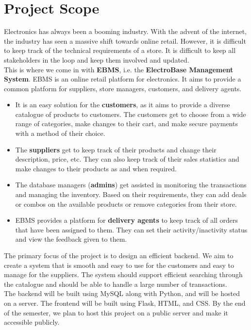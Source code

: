 
\section*{\Huge Project Scope}
\vspace*{10pt}
Electronics has always been a booming industry.
With the advent of the internet, the industry has seen a massive shift towards online retail.
However, it is difficult to keep track of the technical requirements of a store.
It is difficult to keep all stakeholders in the loop and keep them involved and updated.
\vspace*{10pt} \\
This is where we come in with \textbf{EBMS}, i.e. the \textbf{ElectroBase Management System}.
EBMS is an online retail platform for electronics.
It aims to provide a common platform for suppliers, store managers, customers, and delivery agents.
\begin{itemize}
    \item
    It is an easy solution for the \textbf{customers}, as it aims to provide a diverse catalogue of products to customers.
    The customers get to choose from a wide range of categories, make changes to their cart, and make secure payments with a method of their choice.
    \item
    The \textbf{suppliers} get to keep track of their products and change their description, price, etc.
    They can also keep track of their sales statistics and make changes to their products as and when required.
    \item
    The database managers (\textbf{admins}) get assisted in monitoring the transactions and managing the inventory.
    Based on their requirements, they can add deals or combos on the available products or remove categories from their store.
    \item
    EBMS provides a platform for \textbf{delivery agents} to keep track of all orders that have been assigned to them.
    They can set their activity/inactivity status and view the feedback given to them.
\end{itemize}
The primary focus of the project is to design an efficient backend.
We aim to create a system that is smooth and easy to use for the customers and easy to manage for the suppliers.
The system should support efficient searching through the catalogue and should be able to handle a large number of transactions.
\vspace*{10pt} \\
The backend will be built using MySQL along with Python, and will be hosted on a server.
The frontend will be built using Flask, HTML, and CSS.
By the end of the semester, we plan to host this project on a public server and make it accessible publicly.

